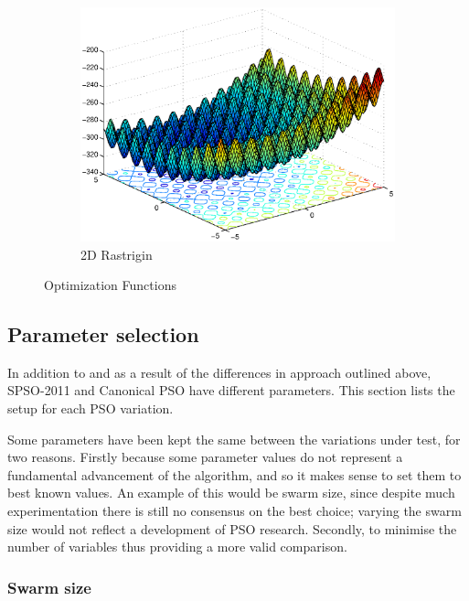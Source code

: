 \documentclass{csfourzero}
\begin{document}
\begin{figure}
  ~
  \begin{subfigure}[b]{0.3\textwidth}
    \includegraphics[width=\textwidth]{../functions/rastrigin_shifted.eps}
    \caption{2D Rastrigin}
    \label{fig:rastrigin}
  \end{subfigure}
  \caption{Optimization Functions}
  \label{fig:functions}
\end{figure}

\subsection{Parameter selection}

In addition to and as a result of the differences in approach outlined above,
SPSO-2011 and Canonical PSO have different parameters.  This section lists the
setup for each PSO variation.

Some parameters have been kept the same between the variations under test, for
two reasons. Firstly because some parameter values do not represent a
fundamental advancement of the algorithm, and so it makes sense to set them to
best known values. An example of this would be swarm size, since despite much
experimentation there is still no consensus on the best choice; varying the
swarm size would not reflect a development of PSO research. Secondly, to
minimise the number of variables thus providing a more valid comparison.

\subsubsection{Swarm size}
\end{document}
